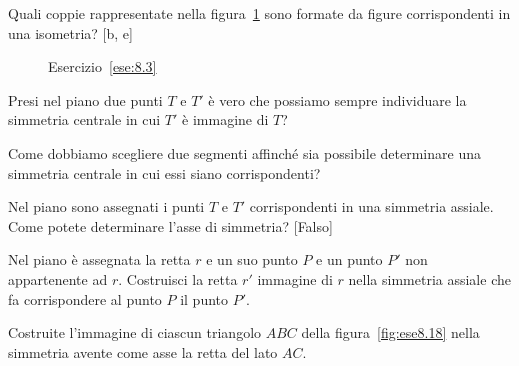 \begin{esercizio}
\label{ese:8.3}
Quali coppie rappresentate nella figura~\ref{fig:ese8.3} sono formate 
da figure corrispondenti in una isometria? \hfill [b, e]
\end{esercizio}


\begin{inaccessibleblock}
 \begin{figure}[!htb]
  \centering
  \caption{Esercizio~\ref{ese:8.3}}\label{fig:ese8.3}
\end{figure}
\end{inaccessibleblock}

\begin{esercizio}
\label{ese:8.4}
Presi nel piano due punti $T$ e $T'$ è vero che possiamo sempre 
individuare la simmetria centrale in cui $T'$ è immagine di $T$?
\end{esercizio}

\begin{esercizio}
\label{ese:8.5}
Come dobbiamo scegliere due segmenti affinché sia possibile 
determinare una simmetria centrale in cui essi siano corrispondenti?
\end{esercizio}

\begin{esercizio}
\label{ese:8.16}
Nel piano sono assegnati i punti $T$ e $T'$ corrispondenti in una 
simmetria assiale. Come potete determinare l'asse di simmetria?
\hfill[Falso]
\end{esercizio}

\noindent\begin{minipage}{0.6\textwidth}\parindent15pt
\begin{esercizio}
\label{ese:8.17}
Nel piano è assegnata la retta $r$ e un suo punto $P$ e un punto $P'$ 
non appartenente ad $r$. Costruisci la retta $r'$ immagine di $r$ 
nella simmetria assiale che fa corrispondere al punto $P$ il punto 
$P'$.
\end{esercizio}
\end{minipage}\hfil
\begin{minipage}{0.4\textwidth}
  \centering
\end{minipage}\vspace{5pt}

\begin{esercizio}
\label{ese:8.18}
Costruite l'immagine di ciascun triangolo $ABC$ della 
figura~\ref{fig:ese8.18} nella simmetria avente come asse la retta 
del lato $AC$.
\end{esercizio}


